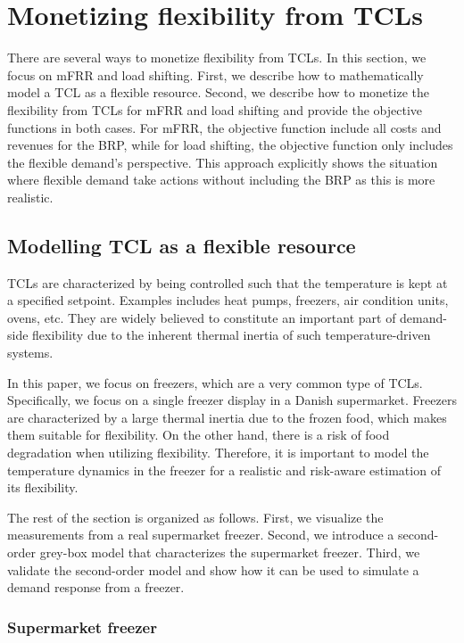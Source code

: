 \section{Monetizing flexibility from TCLs}\label{sec:monetizing_flex}

There are several ways to monetize flexibility from TCLs. In this section, we focus on mFRR and load shifting. First, we describe how to mathematically model a TCL as a flexible resource. Second, we describe how to monetize the flexibility from TCLs for mFRR and load shifting and provide the objective functions in both cases. For mFRR, the objective function include all costs and revenues for the BRP, while for load shifting, the objective function only includes the flexible demand's perspective. This approach explicitly shows the situation where flexible demand take actions without including the BRP as this is more realistic.

\subsection{Modelling TCL as a flexible resource}

TCLs are characterized by being controlled such that the temperature is kept at a specified setpoint. Examples includes heat pumps, freezers, air condition units, ovens, etc. They are widely believed to constitute an important part of demand-side flexibility due to the inherent thermal inertia of such temperature-driven systems.

In this paper, we focus on freezers, which are a very common type of TCLs. Specifically, we focus on a single freezer display in a Danish supermarket. Freezers are characterized by a large thermal inertia due to the frozen food, which makes them suitable for flexibility. On the other hand, there is a risk of food degradation when utilizing flexibility. Therefore, it is important to model the temperature dynamics in the freezer for a realistic and risk-aware estimation of its flexibility.

The rest of the section is organized as follows. First, we visualize the measurements from a real supermarket freezer. Second, we introduce a second-order grey-box model that characterizes the supermarket freezer. Third, we validate the second-order model and show how it can be used to simulate a demand response from a freezer.

\subsubsection{Supermarket freezer}

